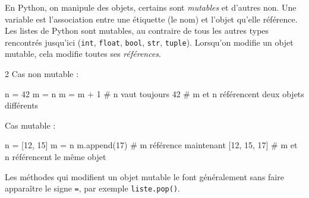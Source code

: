 \documentclass[11pt,a4paper]{article}
\begin{document}
\begin{tcolorbox}[left=0cm,title=\bf{\faPython \; Mutables et non mutables},colbacktitle=cfond]
    En Python, on manipule des objets, certains sont \textit{mutables} et d'autres non. Une variable est l'association entre une étiquette (le nom) et l'objet qu'elle référence. Les listes de Python sont mutables, au contraire de tous les autres types rencontrés jusqu'ici ({\tt int}, {\tt float}, {\tt bool}, {\tt str}, {\tt tuple}). Lorsqu'on modifie un objet mutable, cela modifie toutes ses \textit{références}.
        
    \setlength{\multicolsep}{0pt}
    \begin{multicols}{2}
        Cas non mutable :
        \begin{python}
n = 42
m = n
m = m + 1
# n vaut toujours 42
# m et n référencent deux objets différents
\end{python}
        Cas mutable : 
        \begin{python} 
n = [12, 15]
m = n
m.append(17)
# m référence maintenant [12, 15, 17]
# m et n référencent le même objet
        \end{python}
    \end{multicols}
    Les méthodes qui modifient un objet mutable le font généralement sans faire apparaître le signe {\tt =}, par exemple \texttt{liste.pop()}.
\end{tcolorbox}
\end{document}
